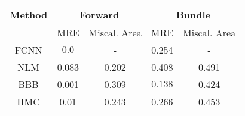 \documentclass[convert={outext=.png}]{standalone}
\begin{document}
\centering
\label{tab:experimental_results}



\begin{tabular}{c c c c c}
\hline
\hline
Method &  \multicolumn{2}{c}{Forward} & \multicolumn{2}{c}{Bundle} \\ \hline
 & MRE & Miscal. Area & MRE & Miscal. Area\\
 FCNN & $\mathbf{0.0}$ & - & 0.254 & - \\
 \hline
 NLM & 0.083 & 0.202 & 0.408 & 0.491 \\
 BBB & 0.001 & 0.309 & $\mathbf{0.138}$ & 0.424 \\
 HMC & 0.01 & 0.243 & 0.266 & 0.453 \\
\hline
\hline
\end{tabular}
\end{document}
